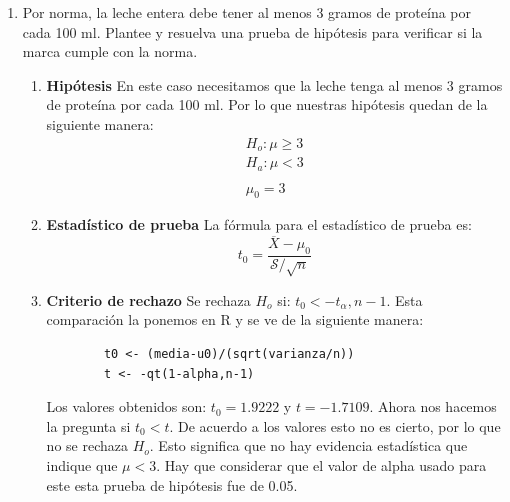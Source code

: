 \documentclass[12pt,a4paper]{article}
\begin{document}
\begin{enumerate}
\begin{enumerate}
    \[ \frac{(n-1)*\mathcal{S}^2}{q_{1-\frac{\alpha}{2}}},\frac{(n-1)*\mathcal{S}^2}{q_{\frac{\alpha}{2}}}  \]
    
    La fórmula en R se usa de la siguiente manera:

    \begin{lstlisting}
      qchi_inf <- qchisq(alpha/2,df=n-1)
      qchi_sup <- qchisq(1-alpha/2,df=n-1)

      cota_inferior <- (n-1)*varianza/qchi_inf
      cota_superior <- (n-1)*varianza/qchi_sup
    \end{lstlisting}

    Lo que nos da el intervalo para la varianza de  \( (0.083 , 0.0261) \)
    \\

    \item Por norma, la leche entera debe tener al menos 3 gramos de proteína por cada 100 ml. Plantee y resuelva una prueba de hipótesis para verificar si la marca cumple con la norma.
    \begin{enumerate}
      \item \textbf{Hipótesis}
      En este caso necesitamos que la leche tenga al menos 3 gramos de proteína por cada 100 ml. Por lo que nuestras hipótesis quedan de la siguiente manera:
      \[
        \begin{array}{c}
          H_o : \mu \geq 3 \\
          H_a : \mu < 3 \\
          \\
          \mu_0 = 3
        \end{array}
      \]

      \item \textbf{Estadístico de prueba}
      La fórmula para el estadístico de prueba es:
      \[
        t_0=\frac{\overline{X}-\mu_0}{\mathcal{S}/\sqrt{n}}
      \]
      
      \item \textbf{Criterio de rechazo}
      Se rechaza \(H_o\) si: \(t_0<-t_{\alpha},n-1\). Esta comparación la ponemos en R y se ve de la siguiente manera:
      \begin{lstlisting}
        t0 <- (media-u0)/(sqrt(varianza/n))
        t <- -qt(1-alpha,n-1)
      \end{lstlisting}

      Los valores obtenidos son: \(t_0=1.9222\) y \(t=-1.7109\). Ahora nos hacemos la pregunta si \(t_0<t\). De acuerdo a los valores esto no es cierto, por lo que no se rechaza \(H_o\). Esto significa que no hay evidencia estadística que indique que \(\mu<3\). Hay que considerar que el valor de alpha usado para este esta prueba de hipótesis fue de 0.05.
    \end{enumerate}


\end{enumerate}
\end{enumerate}
\end{document}
